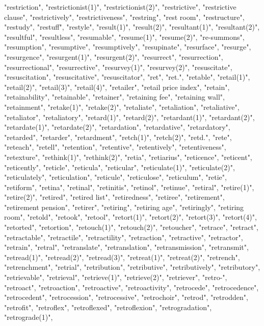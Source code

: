 "restriction",
"restrictionist(1)",
"restrictionist(2)",
"restrictive",
"restrictive clause",
"restrictively",
"restrictiveness",
"restring",
"rest room",
"restructure",
"restudy",
"restuff",
"restyle",
"result(1)",
"result(2)",
"resultant(1)",
"resultant(2)",
"resultful",
"resultless",
"resumable",
"resume(1)",
"resume(2)",
"re-summons",
"resumption",
"resumptive",
"resumptively",
"resupinate",
"resurface",
"resurge",
"resurgence",
"resurgent(1)",
"resurgent(2)",
"resurrect",
"resurrection",
"resurrectional",
"resurrective",
"resurvey(1)",
"resurvey(2)",
"resuscitate",
"resuscitation",
"resuscitative",
"resuscitator",
"ret",
"ret.",
"retable",
"retail(1)",
"retail(2)",
"retail(3)",
"retail(4)",
"retailer",
"retail price index",
"retain",
"retainability",
"retainable",
"retainer",
"retaining fee",
"retaining wall",
"retainment",
"retake(1)",
"retake(2)",
"retaliate",
"retaliation",
"retaliative",
"retaliator",
"retaliatory",
"retard(1)",
"retard(2)",
"retardant(1)",
"retardant(2)",
"retardate(1)",
"retardate(2)",
"retardation",
"retardative",
"retardatory",
"retarded",
"retarder",
"retardment",
"retch(1)",
"retch(2)",
"retd.",
"rete",
"reteach",
"retell",
"retention",
"retentive",
"retentively",
"retentiveness",
"retexture",
"rethink(1)",
"rethink(2)",
"retia",
"retiarius",
"reticence",
"reticent",
"reticently",
"reticle",
"reticula",
"reticular",
"reticulate(1)",
"reticulate(2)",
"reticulately",
"reticulation",
"reticule",
"reticulose",
"reticulum",
"retie",
"retiform",
"retina",
"retinal",
"retinitis",
"retinol",
"retinue",
"retiral",
"retire(1)",
"retire(2)",
"retired",
"retired list",
"retiredness",
"retiree",
"retirement",
"retirement pension",
"retirer",
"retiring",
"retiring age",
"retiringly",
"retiring room",
"retold",
"retook",
"retool",
"retort(1)",
"retort(2)",
"retort(3)",
"retort(4)",
"retorted",
"retortion",
"retouch(1)",
"retouch(2)",
"retoucher",
"retrace",
"retract",
"retractable",
"retractile",
"retractility",
"retraction",
"retractive",
"retractor",
"retrain",
"retral",
"retranslate",
"retranslation",
"retransmission",
"retransmit",
"retread(1)",
"retread(2)",
"retread(3)",
"retreat(1)",
"retreat(2)",
"retrench",
"retrenchment",
"retrial",
"retribution",
"retributive",
"retributively",
"retributory",
"retrievable",
"retrieval",
"retrieve(1)",
"retrieve(2)",
"retriever",
"retro-",
"retroact",
"retroaction",
"retroactive",
"retroactivity",
"retrocede",
"retrocedence",
"retrocedent",
"retrocession",
"retrocessive",
"retrochoir",
"retrod",
"retrodden",
"retrofit",
"retroflex",
"retroflexed",
"retroflexion",
"retrogradation",
"retrograde(1)",
